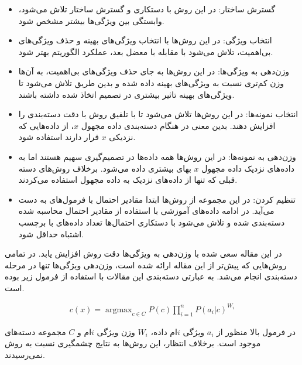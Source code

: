 \documentclass[12pt, a4paper]{article}
\DeclareMathOperator*{\argmax}{argmax}
\begin{document}
\begin{itemize}
    \item گسترش ساختار: در این روش با دستکاری و گسترش ساختار 
    تلاش می‌شود، وابستگی بین ویژگی‌ها بیشتر مشخص شود.
    \item انتخاب ویژگی‌: در این روش‌ها با انتخاب ویژگی‌های بهینه و حذف ویژگی‌های
    بی‌اهمیت، تلاش می‌شود با مقابله با معضل بعد، عملکرد الگوریتم بهتر شود.
    \item وزن‌دهی به ویژگی‌ها: در این روش‌ها به جای حذف ویژگی‌های بی‌اهمیت، به آن‌ها
    وزن کم‌تری نسبت به ویژگی‌های بهینه داده شده و بدین طریق تلاش می‌شود تا ویژگی‌های بهینه تاثیر بیشتری در
    تصمیم اتخاذ شده داشته باشند.
    \item انتخاب نمونه‌ها: در این روش‌ها تلاش می‌شود تا با تلفیق روش 
    با  دقت دسته‌بندی را افزایش دهند. بدین معنی در هنگام دسته‌بندی داده مجهول
    $x$، از داده‌هایی که نزدیکی $x$ قرار دارند استفاده شود.
    \item وزن‌دهی به نمونه‌ها: در این روش‌ها همه داده‌ها در تصمیم‌گیری سهیم هستند اما
    به داده‌های نزدیک داده مجهول $x$ بهای بیشتری داده می‌شود. برخلاف روش‌های دسته قبلی که تنها از داده‌های
    نزدیک به داده مجهول استفاده می‌کردند.
    \item تنظیم کردن: در این مجموعه از روش‌ها ابتدا مقادیر احتمال
    با فرمول‌های  به دست می‌آید. در ادامه داده‌های آموزشی با استفاده از
    مقادیر احتمال محاسبه شده دسته‌بندی شده و تلاش می‌شود با دستکاری احتمال‌ها
    تعداد داده‌های با برچسب اشتباه حداقل شود.
\end{itemize}

در این مقاله سعی شده با وزن‌دهی به ویژگی‌ها دقت روش  افزایش یابد.
در تمامی روش‌هایی که پیش‌تر از این مقاله ارائه شده است، وزن‌دهی ویژگی‌ها تنها در مرحله دسته‌بندی
انجام می‌شد. به عبارتی دسته‌بندی این مقالات با استفاده از فرمول زیر بوده است.

\begin{eqnarray}
    c(x) = \argmax_{c \in C} P(c) \prod_{i=1}^{n} P(a_i|c)^{W_i} \label{old_cx}
\end{eqnarray}

در فرمول بالا منظور از $a_i$ ویژگی $i$ام داده، $W_i$ وزن ویژگی $i$ام و $C$ مجموعه دسته‌های موجود است.
برخلاف انتظار، این روش‌ها به نتایج چشمگیری نسبت به روش 
نمی‌رسیدند.
\end{document}
